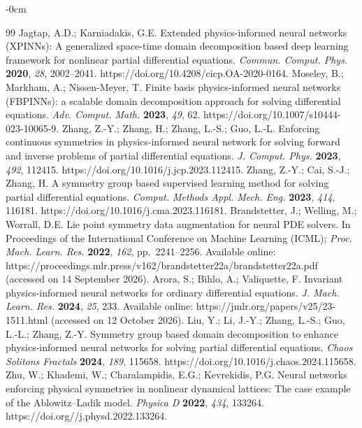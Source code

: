 \begin{adjustwidth}{-\extralength}{0cm}
\begin{thebibliography}{99}
 Jagtap, A.D.; Karniadakis, G.E. Extended physics-informed neural networks (XPINNs): A generalized space-time domain decomposition based deep learning framework for nonlinear partial differential equations. \textit{Commun. Comput. Phys.} \textbf{2020}, \textit{28}, 2002--2041. https://doi.org/10.4208/cicp.OA-2020-0164.
 Moseley, B.; Markham, A.; Nissen-Meyer, T. Finite basis physics-informed neural networks (FBPINNs): a scalable domain decomposition approach for solving differential equations. \textit{Adv. Comput. Math.} \textbf{2023}, \textit{49}, 62. https://doi.org/10.1007/s10444-023-10065-9.
 Zhang, Z.-Y.; Zhang, H.; Zhang, L.-S.; Guo, L.-L. Enforcing continuous symmetries in physics-informed neural network for solving forward and inverse problems of partial differential equations. \textit{J. Comput. Phys.} \textbf{2023}, \textit{492}, 112415. https://doi.org/10.1016/j.jcp.2023.112415.
 Zhang, Z.-Y.; Cai, S.-J.; Zhang, H. A symmetry group based supervised learning method for solving partial differential equations. \textit{Comput. Methods Appl. Mech. Eng.} \textbf{2023}, \textit{414}, 116181. https://doi.org/10.1016/j.cma.2023.116181.
 Brandstetter, J.; Welling, M.; Worrall, D.E. Lie point symmetry data augmentation for neural PDE solvers. In Proceedings of the International Conference on Machine Learning (ICML); \textit{Proc. Mach. Learn. Res.} \textbf{2022}, \textit{162}, pp.\ 2241--2256. Available online: https://proceedings.mlr.press/v162/brandstetter22a/brandstetter22a.pdf (accessed on 14 September 2026).
 Arora, S.; Bihlo, A.; Valiquette, F. Invariant physics-informed neural networks for ordinary differential equations. \textit{J. Mach. Learn. Res.} \textbf{2024}, \textit{25}, 233. Available online: https://jmlr.org/papers/v25/23-1511.html (accessed on 12 October 2026).
 Liu, Y.; Li, J.-Y.; Zhang, L.-S.; Guo, L.-L.; Zhang, Z.-Y. Symmetry group based domain decomposition to enhance physics-informed neural networks for solving partial differential equations. \textit{Chaos Solitons Fractals} \textbf{2024}, \textit{189}, 115658. https://doi.org/10.1016/j.chaos.2024.115658.
 Zhu, W.; Khademi, W.; Charalampidis, E.G.; Kevrekidis, P.G. Neural networks enforcing physical symmetries in nonlinear dynamical lattices: The case example of the Ablowitz--Ladik model. \textit{Physica D} \textbf{2022}, \textit{434}, 133264. https://doi.org//j.physd.2022.133264.

\end{thebibliography}
\end{adjustwidth}
